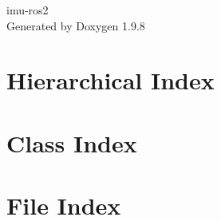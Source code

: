 \documentclass[twoside]{book}
\newcommand{\+}{\discretionary{\mbox{\scriptsize$\hookleftarrow$}}{}{}}
\newcommand{\clearemptydoublepage}{%
    \newpage{\pagestyle{empty}\cleardoublepage}%
  }
\begin{document}
  \raggedbottom
    \hypersetup{pageanchor=false,
                bookmarksnumbered=true,
                pdfencoding=unicode
               }
  \begin{titlepage}
  \vspace*{7cm}
  \begin{center}%
  {\Large imu-\/ros2}\\
  \vspace*{1cm}
  {\large Generated by Doxygen 1.9.8}\\
  \end{center}
  \end{titlepage}
  \clearemptydoublepage
  \tableofcontents
  \clearemptydoublepage
  \hypersetup{pageanchor=true}
\chapter{Hierarchical Index}

\chapter{Class Index}

\chapter{File Index}

\end{document}
